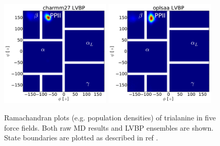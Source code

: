 \documentclass[journal=jacsat,manuscript=article]{achemso}
\begin{document}
\begin{figure}
\includegraphics[width=5.25cm]{figures/ALA3_rama_charmm27_lvbp.pdf}
\includegraphics[width=5.25cm]{figures/ALA3_rama_oplsaa_lvbp.pdf}

\caption{
Ramachandran plots (e.g. population densities) of trialanine in five force fields.  Both raw MD results and LVBP ensembles are shown.  State boundaries are plotted as described in ref \cite{Jha2005}.  
}
\label{figure:ALA3_rama}
\end{figure}

\newpage
\end{document}
